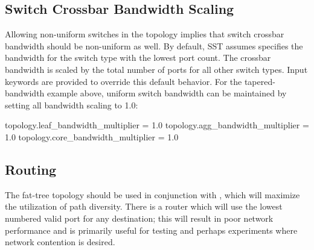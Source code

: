\subsection{Switch Crossbar Bandwidth Scaling}
\label{subsec:fattree:xbarbw}

Allowing non-uniform switches in the topology implies that switch crossbar bandwidth should be non-uniform as well.
By default, SST assumes  specifies the bandwidth for the switch type with the lowest port count.
The crossbar bandwidth is scaled by the total number of ports for all other switch types. 
Input keywords are provided to override this default behavior.
For the tapered-bandwidth example above, uniform switch bandwidth can be maintained by setting all bandwidth scaling to 1.0:

\begin{ViFile}
topology.leaf_bandwidth_multiplier = 1.0
topology.agg_bandwidth_multiplier = 1.0
topology.core_bandwidth_multiplier = 1.0
\end{ViFile}

\subsection{Routing}
\label{subsec:fattree:routing}

The fat-tree topology should be used in conjunction with , which will maximize the utilization of path diversity.
There is a  router which will use the lowest numbered valid port for any destination; this will result in poor network performance and is primarily useful for testing and perhaps experiments where network contention is desired.
